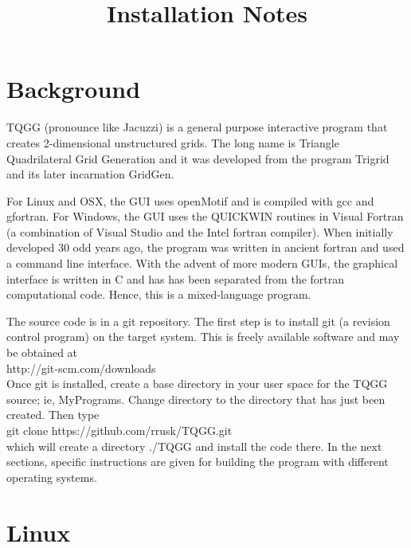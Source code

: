 \documentclass[10pt]{article}
\begin{document}
\title{Installation Notes}

\maketitle

\section{Background}
TQGG (pronounce like Jacuzzi) is a general purpose interactive program that creates
2-dimensional unstructured grids. The long name is Triangle Quadrilateral Grid Generation and it was
developed from the program Trigrid and its later incarnation GridGen.

For Linux and OSX, the GUI uses openMotif and is compiled with gcc and gfortran. 
For Windows, the GUI uses the QUICKWIN routines in Visual Fortran (a combination of
Visual Studio and the Intel fortran compiler). When initially developed 30 odd years 
ago, the program was written in ancient fortran and used a command line interface. With
the advent of more modern GUIs, the graphical interface is written in C and has has 
been separated from the fortran computational code. Hence, this is a mixed-language program.

The source code is in a git repository. The first step is to install git (a revision control program)
on the target system. This is freely available software and may be obtained at \\

\noindent http://git-scm.com/downloads \\

Once git is installed, create a base directory in your user space for the TQGG source; ie, MyPrograms.
Change directory to the directory that has just been created. Then type \\

\noindent git clone https://github.com/rrusk/TQGG.git \\

\noindent which will create a directory ./TQGG and install the code there. In the next sections, 
specific instructions are given for building the program with different operating systems.


\section{Linux}
\end{document}
